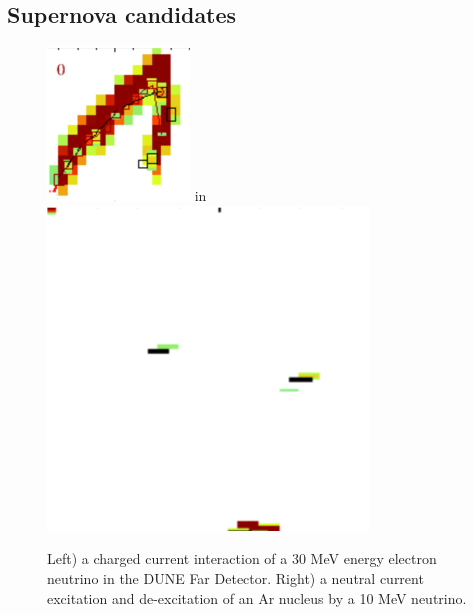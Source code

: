 \subsection{Supernova candidates}


\begin{figure}
\begin{center}
\includegraphics[height=0.3\textwidth]{graphics/IntroFigures/Fig_10a_Picture3.png}  in
\includegraphics[height=0.5\textwidth]{graphics/IntroFigures/Fig_10b_Picture4.png}
\caption{Left) a charged current interaction of a 30 MeV energy electron neutrino in the DUNE Far Detector.  Right) a neutral current excitation and de-excitation of an Ar nucleus by a  10 MeV neutrino.}
\label{blips}
\end{center}
\end{figure}


